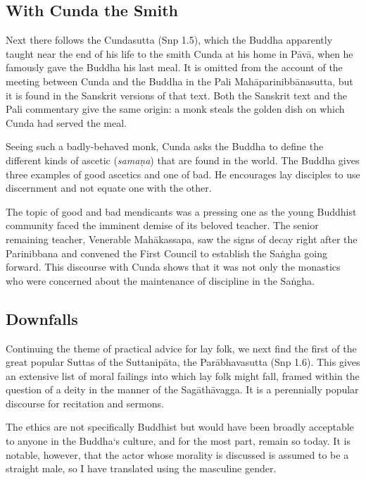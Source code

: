 \documentclass[12pt,openany]{book}%
\begin{document}
\subsection*{With Cunda the Smith}

Next there follows the Cundasutta (Snp 1.5), which the Buddha apparently taught near the end of his life to the smith Cunda at his home in \textsanskrit{Pāvā}, when he famously gave the Buddha his last meal. It is omitted from the account of the meeting between Cunda and the Buddha in the Pali \textsanskrit{Mahāparinibbānasutta}, but it is found in the Sanskrit versions of that text. Both the Sanskrit text and the Pali commentary give the same origin: a monk steals the golden dish on which Cunda had served the meal.

Seeing such a badly-behaved monk, Cunda asks the Buddha to define the different kinds of ascetic (\textit{\textsanskrit{samaṇa}}) that are found in the world. The Buddha gives three examples of good ascetics and one of bad. He encourages lay disciples to use discernment and not equate one with the other.

The topic of good and bad mendicants was a pressing one as the young Buddhist community faced the imminent demise of its beloved teacher. The senior remaining teacher, Venerable \textsanskrit{Mahākassapa}, saw the signs of decay right after the Parinibbana and convened the First Council to establish the \textsanskrit{Saṅgha} going forward. This discourse with Cunda shows that it was not only the monastics who were concerned about the maintenance of discipline in the \textsanskrit{Saṅgha}.

\subsection*{Downfalls}

Continuing the theme of practical advice for lay folk, we next find the first of the great popular Suttas of the \textsanskrit{Suttanipāta}, the \textsanskrit{Parābhavasutta} (Snp 1.6). This gives an extensive list of moral failings into which lay folk might fall, framed within the question of a deity in the manner of the \textsanskrit{Sagāthāvagga}. It is a perennially popular discourse for recitation and sermons.

The ethics are not specifically Buddhist but would have been broadly acceptable to anyone in the Buddha‘s culture, and for the most part, remain so today. It is notable, however, that the actor whose morality is discussed is assumed to be a straight male, so I have translated using the masculine gender.
\end{document}
